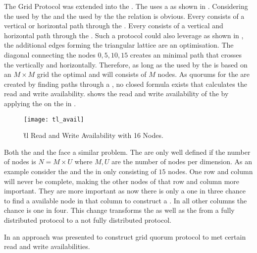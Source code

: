 \documentclass[conference]{IEEEtran}
\begin{document}
The Grid Protocol was extended into the \emph{} \cite{WB92:tlp}.
The  uses a  as shown in .
Considering the  used by the  and the  used by the 
the relation is obvious.
Every  consists of a vertical or horizontal path through the .
Every  consists of a vertical and horizontal path through the .
Such a protocol could also leverage  as shown in , the
additional edges forming the triangular lattice are an optimisation.
The diagonal connecting the nodes \({0,5,10,15}\) creates an minimal path that
crosses the  vertically and horizontally.
Therefore, as long as the  used by the  is based on an \(M \times
M\) grid the optimal  and  will consists of \(M\) nodes.
As quorums for the  are created by finding paths through a , no
closed formula exists that calculates the read and write availability.
 shows the read and write availability of the  by applying
the  on the  in .
\begin{figure}[b]
	\hspace{-10mm}%
	\texttt{[image: tl\_avail]}
	\caption{\G{tl} Read and Write Availability with 16 Nodes.}
	\label{fig:tlrea}
\end{figure}
Both the  and the  face a similar problem.
The are only well defined if the number of nodes is \(N = M \times U\) where
\(M,U\) are the number of nodes per dimension.
As an example consider the  and the  in  only
consisting of \(15\) nodes.
One row and column will never be complete, making the other nodes of that row
and column more important.
They are more important as now there is only a one in three chance to find a
available node in that column to construct a .
In all other columns the chance is one in four.
This change transforms the  as well as the  from a fully
distributed protocol to a not fully distributed protocol.

In \cite{The93:diss} an approach was presented to construct grid quorum
protocol to met certain read and write availabilities.
\end{document}
